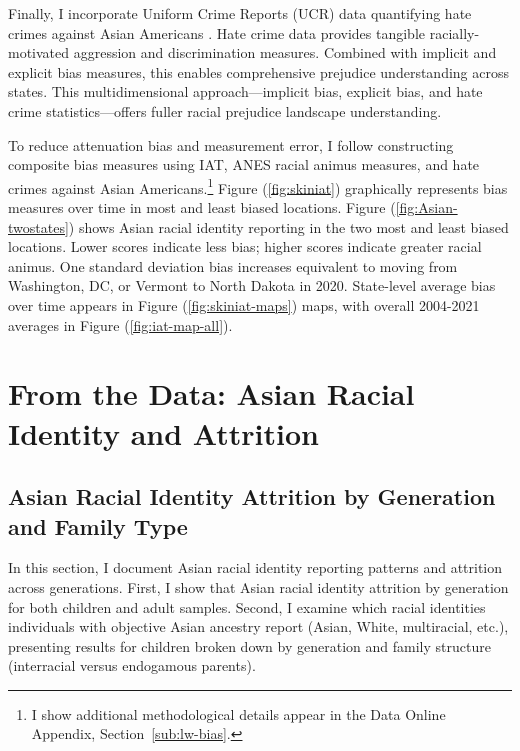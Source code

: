 Finally, I incorporate Uniform Crime Reports (UCR) data quantifying hate crimes against Asian Americans \autocite{ucrbook}. Hate crime data provides tangible racially-motivated aggression and discrimination measures. Combined with implicit and explicit bias measures, this enables comprehensive prejudice understanding across states. This multidimensional approach—implicit bias, explicit bias, and hate crime statistics—offers fuller racial prejudice landscape understanding.

To reduce attenuation bias and measurement error, I follow \textcite{lubotskyInterpretationRegressionsMultiple2006} constructing composite bias measures using IAT, ANES racial animus measures, and hate crimes against Asian Americans.\footnote{I show additional methodological details appear in the Data Online Appendix, Section~\ref{sub:lw-bias}.} Figure (\ref{fig:skiniat}) graphically represents bias measures over time in most and least biased locations. Figure (\ref{fig:Asian-twostates}) shows Asian racial identity reporting in the two most and least biased locations. Lower scores indicate less bias; higher scores indicate greater racial animus. One standard deviation bias increases equivalent to moving from Washington, DC, or Vermont to North Dakota in 2020. State-level average bias over time appears in Figure (\ref{fig:skiniat-maps}) maps, with overall 2004-2021 averages in Figure (\ref{fig:iat-map-all}).

\section{From the Data: Asian Racial Identity and Attrition}\label{sec:attrition}

\subsection{Asian Racial Identity Attrition by Generation and Family Type}

In this section, I document Asian racial identity reporting patterns and attrition across generations. First, I show that Asian racial identity attrition by generation for both children and adult samples. Second, I examine which racial identities individuals with objective Asian ancestry report (Asian, White, multiracial, etc.), presenting results for children broken down by generation and family structure (interracial versus endogamous parents).

